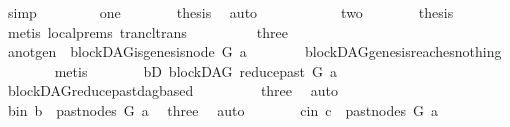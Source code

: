 \begin{isabellebody}
\ simp\isanewline
\ \ \isamarkupfalse%
\isanewline
\ \ \ \ \isamarkupfalse%
\ one\isanewline
\ \ \ \ \isamarkupfalse%
\ \isamarkupfalse%
\ {\isacharquery}{\kern0pt}thesis\ \isamarkupfalse%
\ auto\ \ \ \isanewline
\ \ \isamarkupfalse%
\isanewline
\ \ \ \ \isamarkupfalse%
\ two\isanewline
\ \ \ \ \isamarkupfalse%
\ \isamarkupfalse%
\ {\isacharquery}{\kern0pt}thesis\isanewline
\ \ \ \ \ \ \isamarkupfalse%
\ {\isacharparenleft}{\kern0pt}metis\ {\isachardoublequoteopen}local{\isachardot}{\kern0pt}{}{\isachardot}{\kern0pt}prems{\isachardoublequoteclose}\ trancl{\isacharunderscore}{\kern0pt}trans{\isacharparenright}{\kern0pt}\ \isanewline
\ \ \isamarkupfalse%
\isanewline
\ \ \ \ \isamarkupfalse%
\ three\isanewline
\ \ \ \ \isamarkupfalse%
\ \isamarkupfalse%
\ a{\isacharunderscore}{\kern0pt}not{\isacharunderscore}{\kern0pt}gen{\isacharcolon}{\kern0pt}\ {\isachardoublequoteopen}{\isasymnot}\ blockDAG{\isachardot}{\kern0pt}is{\isacharunderscore}{\kern0pt}genesis{\isacharunderscore}{\kern0pt}node\ G\ a{\isachardoublequoteclose}\isanewline
\ \ \ \ \ \ \isamarkupfalse%
\ blockDAG{\isachardot}{\kern0pt}genesis{\isacharunderscore}{\kern0pt}reaches{\isacharunderscore}{\kern0pt}nothing\isanewline
\ \ \ \ \ \ \isamarkupfalse%
\ metis\isanewline
\ \ \ \ \isamarkupfalse%
\ \isamarkupfalse%
\ bD{\isacharcolon}{\kern0pt}\ {\isachardoublequoteopen}blockDAG\ {\isacharparenleft}{\kern0pt}reduce{\isacharunderscore}{\kern0pt}past\ G\ a{\isacharparenright}{\kern0pt}{\isachardoublequoteclose}\ \isamarkupfalse%
\ blockDAG{\isachardot}{\kern0pt}reduce{\isacharunderscore}{\kern0pt}past{\isacharunderscore}{\kern0pt}dagbased\ \isanewline
\ \ \ \ \ \ \ \ three\ \isamarkupfalse%
\ auto\isanewline
\ \ \ \ \isamarkupfalse%
\ b{\isacharunderscore}{\kern0pt}in{}{\isacharcolon}{\kern0pt}\ {\isachardoublequoteopen}b\ {\isasymin}\ past{\isacharunderscore}{\kern0pt}nodes\ G\ a{\isachardoublequoteclose}\ \isamarkupfalse%
\ three\ \isamarkupfalse%
\ auto\isanewline
\ \ \ \ \isamarkupfalse%
\ \isamarkupfalse%
\ c{\isacharunderscore}{\kern0pt}in{}{\isacharcolon}{\kern0pt}\ {\isachardoublequoteopen}c\ {\isasymin}\ past{\isacharunderscore}{\kern0pt}nodes\ G\ a{\isachardoublequoteclose}\ \isamarkupfalse%

\end{isabellebody}
